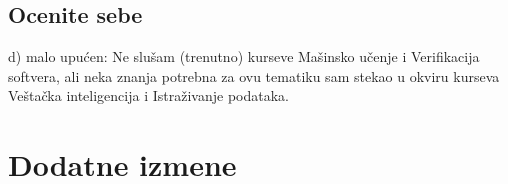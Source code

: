 \documentclass[a4paper]{report}
\begin{document}
\section{Ocenite sebe}

d) malo upućen: Ne slušam (trenutno) kurseve Mašinsko učenje i Verifikacija softvera,
ali neka znanja potrebna za ovu tematiku
sam stekao u okviru kurseva Veštačka inteligencija i Istraživanje podataka.


\chapter{Dodatne izmene}
\end{document}
